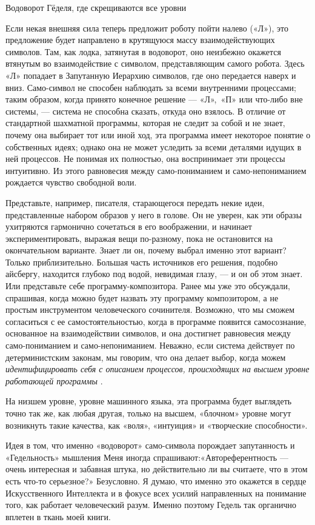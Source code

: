 \documentclass[../main.tex]{subfiles}
\begin{document}
Водоворот Гёделя, где скрещиваются все уровни

Если некая внешняя сила теперь предложит роботу пойти налево («Л»), это предложение будет направлено в крутящуюся массу взаимодействующих символов. Там, как лодка, затянутая в водоворот, оно неизбежно окажется втянутым во взаимодействие с символом, представляющим самого робота. Здесь «Л» попадает в Запутанную Иерархию символов, где оно передается наверх и вниз. Само-символ не способен наблюдать за всеми внутренними процессами; таким образом, когда принято конечное решение --- «Л»,~«П» или что-либо вне системы, --- система не способна сказать, откуда оно взялось. В отличие от стандартной шахматной программы, которая не следит за собой и не знает, почему она выбирает тот или иной ход, эта программа имеет некоторое понятие о собственных идеях; однако она не может уследить за всеми деталями идущих в ней процессов. Не понимая их полностью, она воспринимает эти процессы интуитивно. Из этого равновесия между само-пониманием и само-непониманием рождается чувство свободной воли.

Представьте, например, писателя, старающегося передать некие идеи, представленные набором образов у него в голове. Он не уверен, как эти образы ухитряются гармонично сочетаться в его воображении, и начинает экспериментировать, выражая вещи по-разному, пока не остановится на окончательном варианте. Знает ли он, почему выбрал именно этот вариант? Только приблизительно. Большая часть источников его решения, подобно айсбергу, находится глубоко под водой, невидимая глазу, --- и он об этом знает. Или представьте себе программу-композитора. Ранее мы уже это обсуждали, спрашивая, когда можно будет назвать эту программу композитором, а не простым инструментом человеческого сочинителя. Возможно, что мы сможем согласиться с ее самостоятельностью, когда в программе появится самосознание, основанное на взаимодействии символов, и она достигнет равновесия между само-пониманием и само-непониманием. Неважно, если система действует по детерминистским законам, мы говорим, что она делает выбор, когда можем \emph{идентифицировать себя с описанием процессов, происходящих на высшем уровне работающей программы} .

На низшем уровне, уровне машинного языка, эта программа будет выглядеть точно так же, как любая другая, только на высшем, «блочном» уровне могут возникнуть такие качества, как «воля», «интуиция» и «творческие способности».

Идея в том, что именно «водоворот» само-символа порождает запутанность и «Гедельность» мышления Меня иногда спрашивают:«Автореферентность --- очень интересная и забавная штука, но действительно ли вы считаете, что в этом есть что-то серьезное?» Безусловно. Я думаю, что именно это окажется в сердце Искусственного Интеллекта и в фокусе всех усилий направленных на понимание того, как работает человеческий разум. Именно поэтому Гедель так органично вплетен в ткань моей книги.
\end{document}
